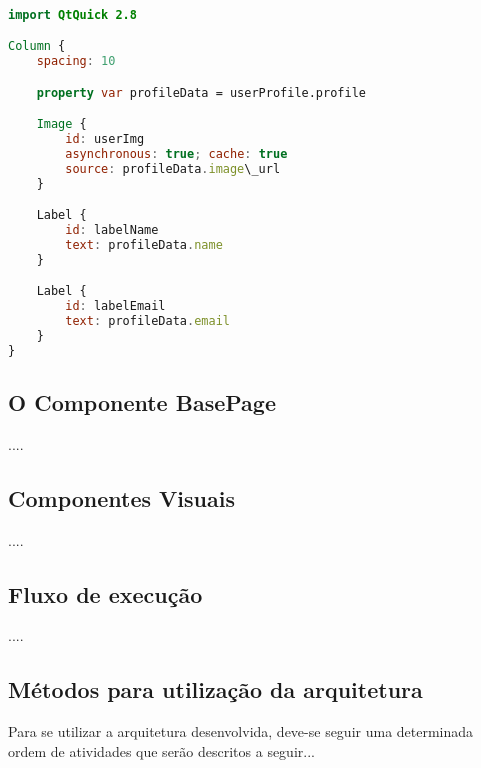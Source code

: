\begin{center}
\begin{lstlisting}[language=qml]

import QtQuick 2.8

Column {
	spacing: 10

	property var profileData = userProfile.profile

	Image {
		id: userImg
		asynchronous: true; cache: true
		source: profileData.image\_url
	}

	Label {
		id: labelName
		text: profileData.name
	}

	Label {
		id: labelEmail
		text: profileData.email
	}
}
\end{lstlisting}
\end{center}


\subsection{O Componente BasePage}\label{sec:solucao-desenvolvida}
....


\subsection{Componentes Visuais}\label{sec:solucao-desenvolvida}
....


\subsection{Fluxo de execução}\label{sec:solucao-desenvolvida}
....


\subsection{Métodos para utilização da arquitetura}
Para se utilizar a arquitetura desenvolvida, deve-se seguir uma determinada ordem de atividades que serão descritos a seguir...
